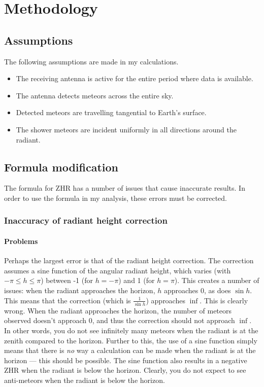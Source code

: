 \section{Methodology}
\subsection{Assumptions}
The following assumptions are made in my calculations.
\begin{itemize}
	\item The receiving antenna is active for the entire period where data is available.
	\item The antenna detects meteors across the entire sky.
	\item Detected meteors are travelling tangential to Earth's surface.
	\item The shower meteors are incident uniformly in all directions around the radiant.
\end{itemize}
\subsection{Formula modification}
The formula \cite{zhr} for ZHR has a number of issues that cause inaccurate results. In order to use the formula in my analysis, these errors must be corrected.
\subsubsection{Inaccuracy of radiant height correction}
\paragraph{Problems\\}
Perhaps the largest error is that of the radiant height correction. The correction assumes a sine function of the angular radiant height, which varies (with $-\pi \leq h \leq \pi$) between -1 (for $h = -\pi$) and 1 (for $h = \pi$). This creates a number of issues: when the radiant approaches the horizon, $h$ approaches 0, as does $\sin h$. This means that the correction (which is $\frac{1}{\sin h}$) approaches $\inf$. This is clearly wrong. When the radiant approaches the horizon, the number of meteors observed doesn't approach 0, and thus the correction should not approach $\inf$. In other words, you do not see infinitely many meteors when the radiant is at the zenith compared to the horizon. Further to this, the use of a sine function simply means that there is \textit{no} way a calculation can be made when the radiant is at the horizon --- this should be possible. The sine function also results in a negative ZHR when the radiant is below the horizon. Clearly, you do not expect to see anti-meteors when the radiant is below the horizon. 

